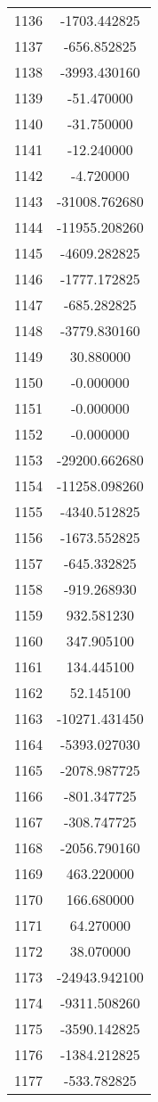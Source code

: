\documentclass[12pt]{article}
\begin{document}
\begin{longtable}{@{}cc@{}}
1136 & -1703.442825 \\
1137 & -656.852825 \\
1138 & -3993.430160 \\
1139 & -51.470000 \\
1140 & -31.750000 \\
1141 & -12.240000 \\
1142 & -4.720000 \\
1143 & -31008.762680 \\
1144 & -11955.208260 \\
1145 & -4609.282825 \\
1146 & -1777.172825 \\
1147 & -685.282825 \\
1148 & -3779.830160 \\
1149 & 30.880000 \\
1150 & -0.000000 \\
1151 & -0.000000 \\
1152 & -0.000000 \\
1153 & -29200.662680 \\
1154 & -11258.098260 \\
1155 & -4340.512825 \\
1156 & -1673.552825 \\
1157 & -645.332825 \\
1158 & -919.268930 \\
1159 & 932.581230 \\
1160 & 347.905100 \\
1161 & 134.445100 \\
1162 & 52.145100 \\
1163 & -10271.431450 \\
1164 & -5393.027030 \\
1165 & -2078.987725 \\
1166 & -801.347725 \\
1167 & -308.747725 \\
1168 & -2056.790160 \\
1169 & 463.220000 \\
1170 & 166.680000 \\
1171 & 64.270000 \\
1172 & 38.070000 \\
1173 & -24943.942100 \\
1174 & -9311.508260 \\
1175 & -3590.142825 \\
1176 & -1384.212825 \\
1177 & -533.782825 \\

\end{longtable}
\end{document}
